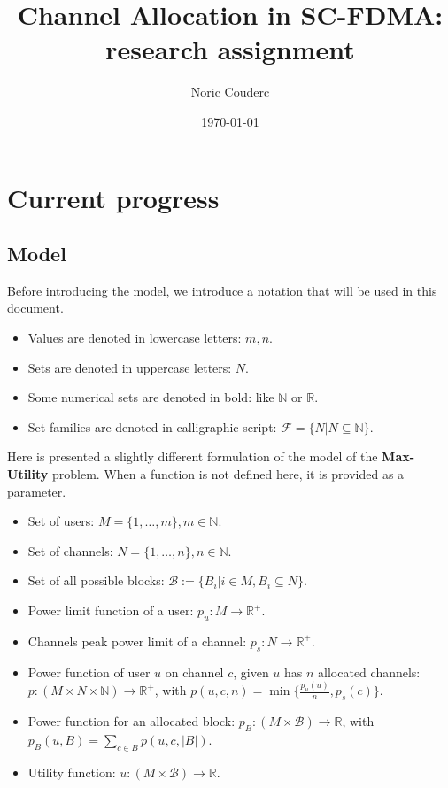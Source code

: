 \documentclass[a4paper, 10pt]{article}
\title{Channel Allocation in SC-FDMA: research assignment}
\author{Noric Couderc}
\date{\today}
\begin{document}
\maketitle
\tableofcontents

\section{Current progress}

\subsection*{Model}

Before introducing the model, we introduce a notation that will be used in this document.
\begin{itemize}
    \item Values are denoted in lowercase letters: $m, n$.
    \item Sets are denoted in uppercase letters: $N$.
    \item Some numerical sets are denoted in bold: like $\mathbb{N}$ or $\mathbb{R}$.
    \item Set families are denoted in calligraphic script: $\mathscr{F} = \{ N | N \subseteq \mathbb{N}\}$.
\end{itemize}

Here is presented a slightly different formulation of the model of the \textbf{Max-Utility} problem. 
When a function is not defined here, it is provided as a parameter.

\begin{itemize}
    \item Set of users: $M = \{1,\dots,m\}, m \in \mathbb{N}$.
    \item Set of channels: $N = \{1,\dots,n\}, n \in \mathbb{N}$.
    \item Set of all possible blocks: 
        $\mathscr{B} := \{ B_i | i \in M, B_i \subseteq N \}$.
    \item Power limit function of a user: $p_u : M \rightarrow \mathbb{R}^+$.
    \item Channels peak power limit of a channel: $p_s : N \rightarrow \mathbb{R}^+$.
    \item Power function of user $u$ on channel $c$,
        given $u$ has $n$ allocated channels:\\
        $p : (M \times N \times \mathbb{N}) \rightarrow \mathbb{R}^+$,
        with $p(u, c, n) = \min\{\frac{p_u(u)}{n}, p_s(c)\}$.
    \item Power function for an allocated block: 
        $p_B : (M \times \mathscr{B}) \rightarrow \mathbb{R}$, 
        with $p_B(u, B) = \sum_{c \in B} p(u, c, |B|)$.
    \item Utility function: 
        $u : (M \times \mathscr{B}) \rightarrow \mathbb{R}$.
\end{itemize}
\end{document}

